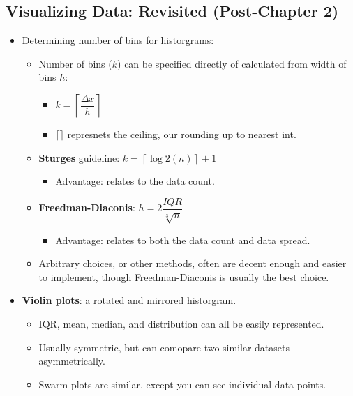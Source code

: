 \documentclass[12pt,a4paper]{article}
\begin{document}
\subsection{Visualizing Data: Revisited (Post-Chapter 2)}
\begin{itemize}
    \item Determining {\color{o-Sun}number of bins} for historgrams: 
        \begin{itemize}
            \item Number of bins (\(k\)) can be specified directly of calculated from width of bins \(h\):
                \begin{itemize}
                    \item \(k = \left\lceil \dfrac{\Delta x}{h} \right\rceil \)
                    \item \(\lceil \rceil \) represnets the ceiling, our rounding up to nearest int.
                \end{itemize}
            \item \textbf{Sturges} guideline: \(k=\left\lceil \log2(n)\right\rceil +1 \)
                \begin{itemize}
                    \item Advantage: relates to the data count.
                \end{itemize}
            \item \textbf{Freedman-Diaconis}: \(h = 2\dfrac{IQR}{\sqrt[3]{n}}\)
                \begin{itemize}
                    \item Advantage: relates to both the data count and data spread.
                \end{itemize}
            \item Arbitrary choices, or other methods, often are decent enough and easier to implement, though Freedman-Diaconis is usually the best choice.
        \end{itemize}
    \item \textbf{Violin plots}: a {\color{o-Sun}rotated} and {\color{o-Sun}mirrored} historgram. 
        \begin{itemize}
            \item IQR, mean, median, and distribution can all be easily represented.
            \item Usually symmetric, but can comopare two similar datasets asymmetrically.
            \item Swarm plots are similar, except you can see individual data points.
        \end{itemize}
\end{itemize}
\end{document}
